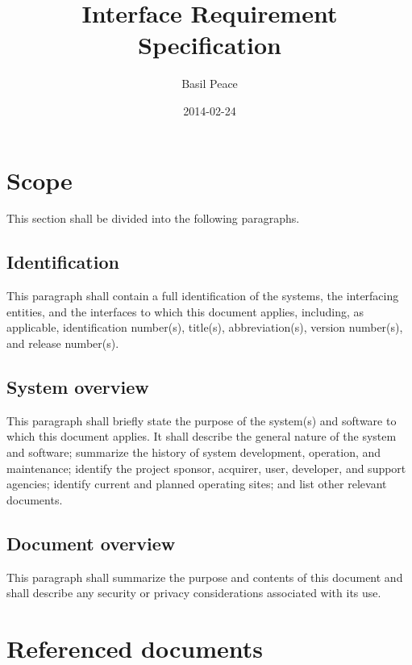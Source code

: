 \documentclass{fidata-report-template}
\begin{document}
\frontmatter

\title{Interface Requirement Specification}

\date{2014-02-24}

\author{Basil Peace}

\maketitle
\tableofcontents

\section{Scope}

This section shall be divided into the following paragraphs.

\subsection{Identification}

This paragraph shall contain a full identification of the systems, the
interfacing entities, and the interfaces to which this document applies,
including, as applicable, identification number(s), title(s),
abbreviation(s), version number(s), and release number(s).

\subsection{System overview}

This paragraph shall briefly state the purpose of the system(s) and
software to which this document applies. It shall describe the general
nature of the system and software; summarize the history of system
development, operation, and maintenance; identify the project sponsor,
acquirer, user, developer, and support agencies; identify current and
planned operating sites; and list other relevant documents.

\subsection{Document overview}

This paragraph shall summarize the purpose and contents of this document
and shall describe any security or privacy considerations associated
with its use.

\section{Referenced documents}
\end{document}
